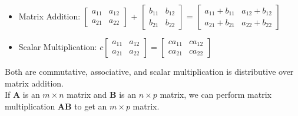 \documentclass[11pt]{scrartcl}
\theoremstyle{plain}
\theoremstyle{definition}
\theoremstyle{remark}
\begin{document}
\begin{itemize}
    \item Matrix Addition: $\begin{bmatrix}a_{11} & a_{12} \\ a_{21} & a_{22}\end{bmatrix}$ + $\begin{bmatrix}
    b_{11} & b_{12} \\ b_{21} & b_{22}\end{bmatrix}$ = $\begin{bmatrix}a_{11} + b_{11} & a_{12} + b_{12} \\ 
    a_{21} + b_{21} & a_{22} + b_{22}\end{bmatrix}$
    \item Scalar Multiplication: $c\begin{bmatrix}a_{11} & a_{12} \\ a_{21} & a_{22}\end{bmatrix}=\begin{bmatrix}
    ca_{11} & ca_{12} \\ ca_{21} & ca_{22}\end{bmatrix}$
\end{itemize}

Both are commutative, associative, and scalar multiplication is distributive over matrix addition. \\

If $\mathbf{A}$ is an $m\times n$ matrix and $\mathbf{B}$ is an $n\times p$ matrix, we can perform matrix 
multiplication $\mathbf{A}\mathbf{B}$ to get an $m\times p$ matrix.
\end{document}
